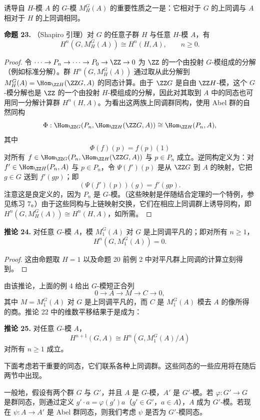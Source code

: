 诱导自 $H$-模 $A$ 的 $G$-模 $M_H^G(A)$ 的重要性质之一是：它相对于 $G$ 的上同调与 $A$ 相对于 $H$ 的上同调相同。

\medskip
\noindent\textbf{命题 23.} （Shapiro 引理）对 $G$ 的任意子群 $H$ 与任意 $H$-模 $A$，有
\[
  H^n(G,M_H^G(A))\cong H^n(H,A),
  \qquad n\geq0.
\]

\begin{proof}
令 $\cdots\to P_n\to\cdots\to P_0\to\ZZ\to0$ 为 $\ZZ$ 的一个由投射 $G$-模组成的分解（例如标准分解）。群 $H^n(G,M_H^G(A))$ 通过取从此分解到 $M_H^G(A)=\Hom_{\ZZ H}(\ZZ G,A)$ 的同态计算。由于 $\ZZ G$ 是自由 $\ZZ H$-模，这个 $G$-模分解也是 $\ZZ$ 的一个由投射 $H$-模组成的分解，因此对其取到 $A$ 中的同态也可用同一分解计算群 $H^n(H,A)$。为看出这两族上同调群同构，使用 Abel 群的自然同构
\[
  \Phi:\Hom_{\ZZ G}(P_n,\Hom_{\ZZ H}(\ZZ G,A))\cong\Hom_{\ZZ H}(P_n,A),
\]
其中
\[
  \Phi(f)(p)=f(p)(1)
\]
对所有 $f\in\Hom_{\ZZ G}(P_n,\Hom_{\ZZ H}(\ZZ G,A))$ 与 $p\in P_n$ 成立。逆同构定义为：对 $f'\in\Hom_{\ZZ H}(P_n,A)$ 与 $p\in P_n$，令 $\Psi(f')(p)$ 是从 $\ZZ G$ 到 $A$ 的映射，它把 $g\in G$ 送到 $f'(gp)$；即
\[
  (\Psi(f')(p))(g)=f'(gp).
\]
注意这是良定义的，因为 $P_n$ 是 $G$-模。（这些映射是伴随结合定理的一个特例，参见练习 7。）由于这些同构与上链映射交换，它们在相应上同调群上诱导同构，即 $H^n(G,M_H^G(A))\cong H^n(H,A)$，如所需。
\end{proof}

\medskip
\noindent\textbf{推论 24.} 对任意 $G$-模 $A$，模 $M_1^G(A)$ 对 $G$ 是上同调平凡的；即对所有 $n\geq1$，
\[
  H^n(G,M_1^G(A))=0.
\]

\begin{proof}
这由命题取 $H=1$ 以及命题 20 前例 2 中对平凡群上同调的计算立刻得到。
\end{proof}

由该推论，上面的例 4 给出 $G$-模短正合列
\[
  0\to A\to M\to C\to0,
\]
其中 $M=M_1^G(A)$ 对 $G$ 是上同调平凡的，而 $C$ 是 $M_1^G(A)$ 模去 $A$ 的像所得的商。推论 22 中的维数平移结果于是成为：

\medskip
\noindent\textbf{推论 25.} 对任意 $G$-模 $A$，
\[
  H^{n+1}(G,A)\cong H^n(G,M_1^G(A)/A)
\]
对所有 $n\geq1$ 成立。

下面考虑若干重要的同态，它们联系各种上同调群。这些同态的一些应用将在随后两节中出现。

一般地，假设有两个群 $G$ 与 $G'$，并且 $A$ 是 $G$-模，$A'$ 是 $G'$-模。若 $\varphi:G'\to G$ 是群同态，则通过定义 $g'\cdot a=\varphi(g')a$（$g'\in G'$，$a\in A$），$A$ 成为 $G'$-模。若现在 $\psi:A\to A'$ 是 Abel 群同态，则我们考虑 $\psi$ 是否为 $G'$-模同态。

